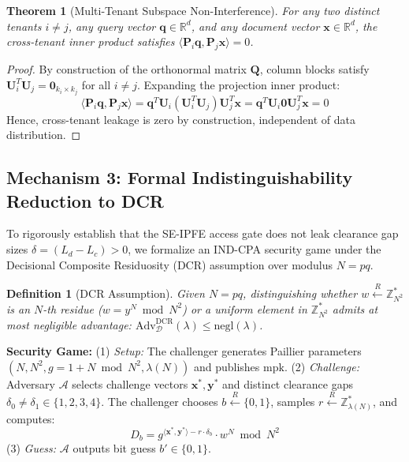 \documentclass[10pt,a4paper]{article}
\newtheorem{theorem}{Theorem}
\newtheorem{definition}{Definition}
\begin{document}
\begin{theorem}[Multi-Tenant Subspace Non-Interference]
For any two distinct tenants $i \neq j$, any query vector $\mathbf{q} \in \mathbb{R}^d$, and any document vector $\mathbf{x} \in \mathbb{R}^d$, the cross-tenant inner product satisfies $\langle \mathbf{P}_i \mathbf{q}, \mathbf{P}_j \mathbf{x} \rangle = 0$.
\end{theorem}
\begin{proof}
By construction of the orthonormal matrix $\mathbf{Q}$, column blocks satisfy $\mathbf{U}_i^T \mathbf{U}_j = \mathbf{0}_{k_i \times k_j}$ for all $i \neq j$. Expanding the projection inner product:
\begin{equation}
    \langle \mathbf{P}_i \mathbf{q}, \mathbf{P}_j \mathbf{x} \rangle = \mathbf{q}^T \mathbf{U}_i (\mathbf{U}_i^T \mathbf{U}_j) \mathbf{U}_j^T \mathbf{x} = \mathbf{q}^T \mathbf{U}_i \mathbf{0} \mathbf{U}_j^T \mathbf{x} = 0
\end{equation}
Hence, cross-tenant leakage is zero by construction, independent of data distribution.
\end{proof}

\subsection{Mechanism 3: Formal Indistinguishability Reduction to DCR}
To rigorously establish that the SE-IPFE access gate does not leak clearance gap sizes $\delta = (L_d - L_c) > 0$, we formalize an IND-CPA security game under the Decisional Composite Residuosity (DCR) assumption over modulus $N = pq$.

\begin{definition}[DCR Assumption]
Given $N = pq$, distinguishing whether $w \xleftarrow{R} \mathbb{Z}_{N^2}^*$ is an $N$-th residue ($w = y^N \bmod N^2$) or a uniform element in $\mathbb{Z}_{N^2}^*$ admits at most negligible advantage: $\text{Adv}_{\mathcal{D}}^{\text{DCR}}(\lambda) \le \text{negl}(\lambda)$.
\end{definition}

\textbf{Security Game:} (1) \textit{Setup:} The challenger generates Paillier parameters $(N, N^2, g = 1 + N \bmod N^2, \lambda(N))$ and publishes $\text{mpk}$. (2) \textit{Challenge:} Adversary $\mathcal{A}$ selects challenge vectors $\mathbf{x}^*, \mathbf{y}^*$ and distinct clearance gaps $\delta_0 \neq \delta_1 \in \{1,2,3,4\}$. The challenger chooses $b \xleftarrow{R} \{0,1\}$, samples $r \xleftarrow{R} \mathbb{Z}_{\lambda(N)}^*$, and computes:
\begin{equation}
    D_b = g^{\langle \mathbf{x}^*, \mathbf{y}^* \rangle - r \cdot \delta_b} \cdot w^N \bmod N^2
\end{equation}
(3) \textit{Guess:} $\mathcal{A}$ outputs bit guess $b' \in \{0,1\}$.
\end{document}
